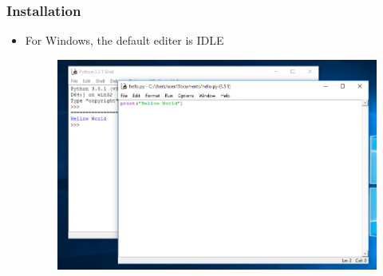 
\begin{frame}
\frametitle{Installation}

\begin{itemize}
\item For Windows, the default editer is IDLE
\begin{figure}
\includegraphics[width=0.8\linewidth]{IDLE.png}
\end{figure}
\end{itemize}

\end{frame}
